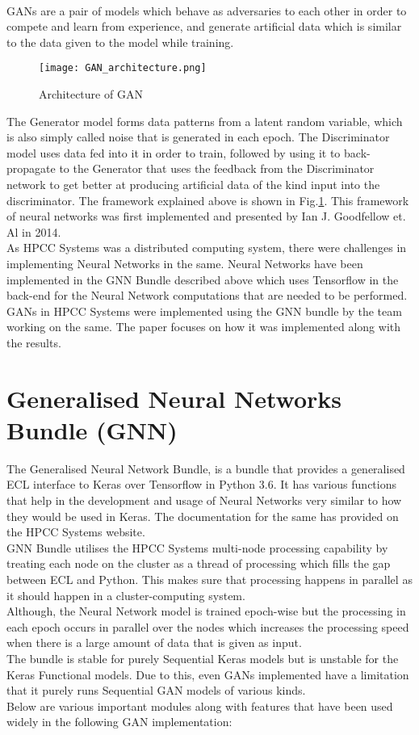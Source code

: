 \documentclass[conference]{IEEEtran}
\begin{document}
\\
GANs are a pair of models which behave as adversaries to each other in order to compete and learn from experience, and generate artificial data which is similar to the data given to the model while training.
\\
\begin{figure}
    \centerline{\texttt{[image: GAN\_architecture.png]}}
    \caption{Architecture of GAN}
    \label{fig:ganarch}
\end{figure}
The Generator model forms data patterns from a latent random variable, which is also simply called noise that is generated in each epoch. The Discriminator model uses data fed into it in order to train, followed by using it to back-propagate to the Generator that uses the feedback from the Discriminator network to get better at producing artificial data of the kind input into the discriminator. The framework explained above is shown in Fig.\ref{fig:ganarch}. This framework of neural networks was first implemented and presented by Ian J. Goodfellow et. Al in 2014\cite{iangan}.
\\
As HPCC Systems was a distributed computing system, there were challenges in implementing Neural Networks in the same. Neural Networks have been implemented in the GNN Bundle described above which uses Tensorflow in the back-end for the Neural Network computations that are needed to be performed. GANs in HPCC Systems were implemented using the GNN bundle by the team working on the same. The paper focuses on how it was implemented along with the results. 

\section{Generalised Neural Networks Bundle (GNN)}\label{gnnsec}

The Generalised Neural Network Bundle, is a bundle that provides a generalised ECL interface to Keras over Tensorflow in Python 3.6. It has various functions that help in the development and usage of Neural Networks very similar to how they would be used in Keras. The documentation for the same has provided on the HPCC Systems website\cite{gnnpaper}.
\\
GNN Bundle utilises the HPCC Systems multi-node processing capability by treating each node on the cluster as a thread of processing which fills the gap between ECL and Python. This makes sure that processing happens in parallel as it should happen in a cluster-computing system. 
\\
Although, the Neural Network model is trained epoch-wise but the processing in each epoch occurs in parallel over the nodes which increases the processing speed when there is a large amount of data that is given as input. 
\\
The bundle is stable for purely Sequential Keras models but is unstable for the Keras Functional models. Due to this, even GANs implemented have a limitation that it purely runs Sequential GAN models of various kinds.
\\
Below are various important modules along with features that have been used widely in the following GAN implementation:
\end{document}

